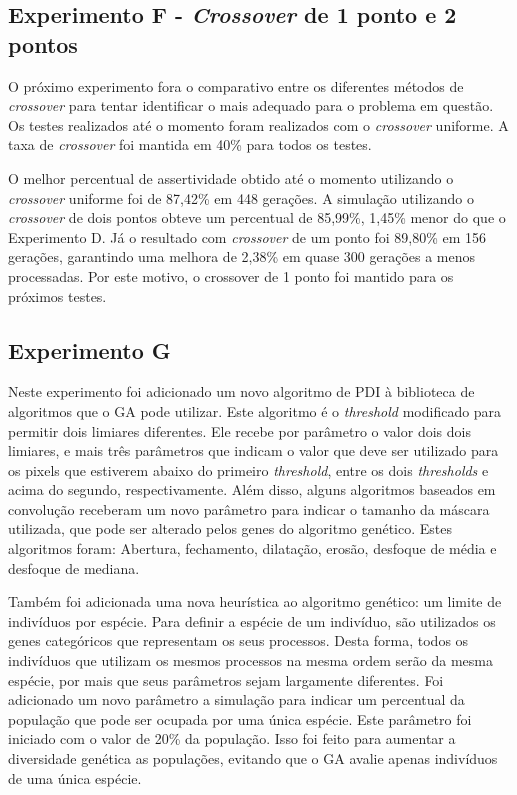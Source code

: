\documentclass[12pt,oneside,a4paper,english,french,spanish,brazil,]{abntex2}
\begin{document}
\subsection{Experimento F - \textit{Crossover} de 1 ponto e 2 pontos}

O próximo experimento fora o comparativo entre os diferentes métodos de \textit{crossover} para tentar identificar o mais adequado para o problema em questão. Os testes realizados até o momento foram realizados com o \textit{crossover} uniforme. A taxa de \textit{crossover} foi mantida em 40\% para todos os testes.

O melhor percentual de assertividade obtido até o momento utilizando o \textit{crossover} uniforme foi de 87,42\% em 448 gerações. A simulação utilizando o \textit{crossover} de dois pontos obteve um percentual de 85,99\%, 1,45\% menor do que o Experimento D. Já o resultado com \textit{crossover} de um ponto foi 89,80\% em 156 gerações, garantindo uma melhora de 2,38\% em quase 300 gerações a menos processadas. Por este motivo, o crossover de 1 ponto foi mantido para os próximos testes.

\subsection{Experimento G}

Neste experimento foi adicionado um novo algoritmo de PDI à biblioteca de algoritmos que o GA pode utilizar. Este algoritmo é o \textit{threshold} modificado para permitir dois limiares diferentes. Ele recebe por parâmetro o valor dois dois limiares, e mais três parâmetros que indicam o valor que deve ser utilizado para os pixels que estiverem abaixo do primeiro \textit{threshold}, entre os dois \textit{thresholds} e acima do segundo, respectivamente. Além disso, alguns algoritmos baseados em convolução receberam um novo parâmetro para indicar o tamanho da máscara utilizada, que pode ser alterado pelos genes do algoritmo genético. Estes algoritmos foram: Abertura, fechamento, dilatação, erosão, desfoque de média e desfoque de mediana.

Também foi adicionada uma nova heurística ao algoritmo genético: um limite de indivíduos por espécie. Para definir a espécie de um indivíduo, são utilizados os genes categóricos que representam os seus processos. Desta forma, todos os indivíduos que utilizam os mesmos processos na mesma ordem serão da mesma espécie, por mais que seus parâmetros sejam largamente diferentes. Foi adicionado um novo parâmetro a simulação para indicar um percentual da população que pode ser ocupada por uma única espécie. Este parâmetro foi iniciado com o valor de 20\% da população. Isso foi feito para aumentar a diversidade genética as populações, evitando que o GA avalie apenas indivíduos de uma única espécie.
\end{document}
